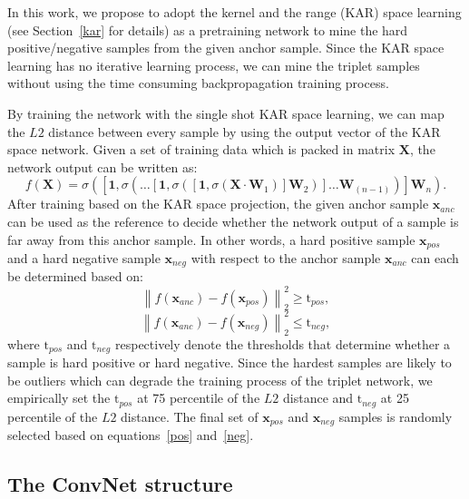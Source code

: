 \documentclass[sigconf]{acmart}
\begin{document}
In this work, we propose to adopt the kernel and the range (KAR) space learning (see Section~\ref{kar} for details) as a pretraining network to mine the hard positive/negative samples from the given anchor sample. Since the KAR space learning has no iterative learning process, we can mine the triplet samples without using the time consuming backpropagation training process.
 
By training the network with the single shot KAR space learning, we can map the $L2$ distance between every sample by using the output vector of the KAR space network. Given a set of training data which is packed in matrix $\mathbf{X}$, the network output can be written as:
\begin{equation}
    f\left(\mathbf{X}\right)=\sigma\left(\left[\mathbf{1},\sigma\left(\dots\left[\mathbf{1},\sigma\left(\left[\mathbf{1},\sigma\left(\mathbf{X}\cdot\mathbf{W}_{1}\right)\right]\mathbf{W}_{2}\right)\right]\dots\mathbf{W}_{(n-1)}\right)\right]\mathbf{W}_{n}\right).
\end{equation}
After training based on the KAR space projection, the given anchor sample $\mathbf{x}_{anc}$ can be used as the reference to decide whether the network output of a sample is far away from this anchor sample. In other words, a hard positive sample $\mathbf{x}_{pos}$ and a hard negative sample $\mathbf{x}_{neg}$ with respect to the anchor sample $\mathbf{x}_{anc}$ can each be determined based on:
\begin{equation}
    {\left\| {{f\left(\mathbf{x}_{anc}\right)} - {f\left(\mathbf{x}_{pos}\right)}} \right\|_2^2} \geq \mathrm{t}_{pos}, \label{pos}
\end{equation}
\begin{equation}
    {\left\| {{f\left(\mathbf{x}_{anc}\right)} - {f\left(\mathbf{x}_{neg}\right)}} \right\|_2^2} \leq \mathrm{t}_{neg},\label{neg}
\end{equation}
where $\mathrm{t}_{pos}$ and $\mathrm{t}_{neg}$ respectively denote the thresholds that determine whether a sample is hard positive or hard negative. Since the hardest samples are likely to be outliers which can degrade the training process of the triplet network, we empirically set the $\mathrm{t}_{pos}$ at 75 percentile of the $L2$ distance and $\mathrm{t}_{neg}$ at 25 percentile of the $L2$ distance. The final set of $\mathbf{x}_{pos}$ and $\mathbf{x}_{neg}$ samples is randomly selected based on equations~\eqref{pos} and~\eqref{neg}.

\subsection{The ConvNet structure}
\end{document}
